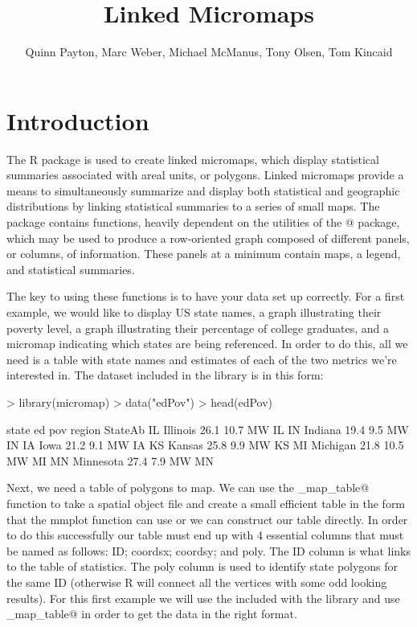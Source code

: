 \documentclass{article}
\newcommand{\R}{{\normalfont\textsf{R }}{}}
\begin{document}


\title{Linked Micromaps}

\author{Quinn Payton, Marc Weber, Michael McManus, Tony Olsen, Tom Kincaid}
\maketitle


\section{Introduction}
The \R package \verb@micromap@ is used to create linked micromaps, which display statistical summaries associated with areal units, or polygons. Linked micromaps provide a means to simultaneously summarize and display both statistical and geographic distributions by linking statistical summaries to a series of small maps. The package contains functions, heavily dependent on the utilities of the @ package, which may be used to produce a row-oriented graph composed of different panels, or columns, of information. These panels at a minimum contain maps, a legend, and statistical summaries.

The key to using these functions is to have your data set up correctly. For a first example, we would like to display US state names, a graph illustrating their poverty level, a graph illustrating their percentage of college graduates, and a micromap indicating which states are being referenced. In order to do this, all we need is a table with state names and estimates of each of the two metrics we're interested in. The dataset \verb@edpov@ included in the \verb@micromap@ library is in this form:

\begin{Schunk}
\begin{Sinput}
> library(micromap)
> data("edPov") 
> head(edPov)
\end{Sinput}
\begin{Soutput}
       state   ed  pov region StateAb
IL  Illinois 26.1 10.7     MW      IL
IN   Indiana 19.4  9.5     MW      IN
IA      Iowa 21.2  9.1     MW      IA
KS    Kansas 25.8  9.9     MW      KS
MI  Michigan 21.8 10.5     MW      MI
MN Minnesota 27.4  7.9     MW      MN
\end{Soutput}
\end{Schunk}

Next, we need a table of polygons to map. We can use the \verb@create_map_table@ function to take a spatial object file and create a small efficient table in the form that the mmplot function can use or we can construct our table directly.  In order to do this successfully our table must end up with 4 essential columns that must be named as follows:  ID; coordsx; coordsy; and poly. The ID column is what links to the table of statistics. The poly column is used to identify state polygons for the same ID (otherwise R will connect all the vertices with some odd looking results). For this first example we will use the \verb@USstates@ included with the library and use \verb@create_map_table@ in order to get the data in the right format. 
\end{document}
